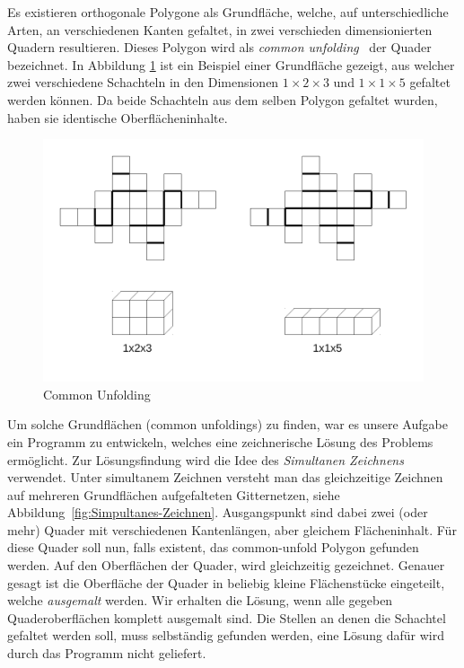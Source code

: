 Es existieren orthogonale Polygone als Grundfläche, welche, auf unterschiedliche Arten, \dH an verschiedenen Kanten gefaltet, in zwei verschieden dimensionierten Quadern resultieren. Dieses Polygon wird als \emph{common unfolding}~\cite{commonUnfold} der Quader bezeichnet. In Abbildung \ref{fig:Common-Unfolding} ist ein Beispiel einer Grundfläche gezeigt, aus welcher zwei verschiedene Schachteln in den Dimensionen $1\times2\times3$ und $1\times1\times5$ gefaltet werden können. Da beide Schachteln aus dem selben Polygon gefaltet wurden, haben sie identische Oberflächeninhalte.

\begin{figure}[htbp]
\centering
\includegraphics[scale=0.5]{03_pics/commonUnfold_beispiel1.pdf}
\caption{Common Unfolding}
\label{fig:Common-Unfolding}
\end{figure}

Um solche Grundflächen (common unfoldings) zu finden, war es unsere Aufgabe ein Programm zu entwickeln, welches eine zeichnerische Lösung des Problems ermöglicht. Zur Lösungsfindung wird die Idee des \emph{Simultanen Zeichnens} verwendet. Unter simultanem Zeichnen versteht man das gleichzeitige Zeichnen auf mehreren Grundflächen \bzw aufgefalteten Gitternetzen, siehe Abbildung~\ref{fig:Simpultanes-Zeichnen}. Ausgangspunkt sind dabei zwei (oder mehr) Quader mit verschiedenen Kantenlängen, aber gleichem Flächeninhalt. Für diese Quader soll nun, falls existent, das common-unfold Polygon gefunden werden. Auf den Oberflächen der Quader, wird gleichzeitig gezeichnet. Genauer gesagt ist die Oberfläche der Quader in beliebig kleine Flächenstücke eingeteilt, welche \emph{ausgemalt} werden. Wir erhalten die Lösung, wenn alle gegeben Quaderoberflächen komplett ausgemalt sind. Die Stellen an denen die Schachtel gefaltet werden soll, muss selbständig gefunden werden, eine Lösung dafür wird durch das Programm nicht geliefert. 


